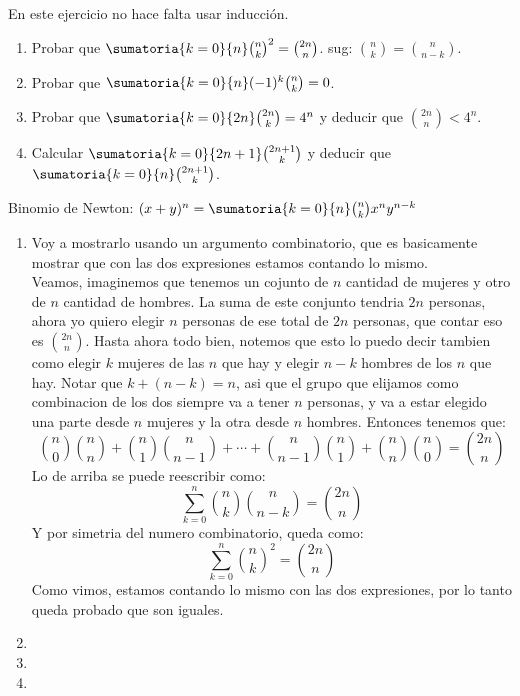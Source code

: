 \begin{enunciado}{\ejercicio}
  En este ejercicio no hace falta usar inducción.
  \begin{enumerate}[label=\roman*)]
    \item Probar que $\sumatoria{k = 0}{n} \binom{n}{k}^2 = \binom{2n}{n}$. \qquad sug: $\binom{n}{k} = \binom{n}{n-k}$.
    \item Probar que $\sumatoria{k = 0}{n} (-1)^k \binom{n}{k} = 0$.
    \item Probar que $\sumatoria{k = 0}{2n} \binom{2n}{k} = 4^n$ y deducir que $\binom{2n}{n} < 4^n$.
    \item Calcular $\sumatoria{k = 0}{2n+1} \binom{2n+1}{k}$ y deducir que $\sumatoria{k=0}{n} \binom{2n+1}{k}$.
  \end{enumerate}
\end{enunciado}

Binomio de Newton: $(x + y)^n = \sumatoria{k=0}{n} \binom{n}{k} x^n y^{n-k}$

\begin{enumerate}[label=\roman*)]
  \item
        Voy a mostrarlo usando un 
        argumento combinatorio, que es basicamente mostrar que con las dos expresiones estamos contando lo mismo. \\
        Veamos, imaginemos que tenemos un cojunto de $n$ cantidad de mujeres y otro de $n$ cantidad de hombres. La suma de este 
        conjunto tendria $2n$ personas, ahora yo quiero elegir $n$ personas de ese total de $2n$ personas, que contar eso es 
        $\binom{2n}{n}$. Hasta ahora todo bien, notemos que esto lo puedo decir tambien como elegir $k$ mujeres de las $n$ que hay 
        y elegir $n - k$ hombres de los $n$ que hay. Notar que $k + (n - k) = n$, asi que el grupo que elijamos como combinacion
        de los dos siempre va a tener $n$ personas, y va a estar elegido una parte desde $n$ mujeres y la otra desde $n$ hombres. 
        Entonces tenemos que:
        \[
        \binom{n}{0}\binom{n}{n} + \binom{n}{1}\binom{n}{n - 1} + \cdots + \binom{n}{n - 1}\binom{n}{1} + \binom{n}{n}\binom{n}{0} = \binom{2n}{n}
        \]
        Lo de arriba se puede reescribir como:
        \[
        \sum_{k = 0}^{n}\binom{n}{k}\binom{n}{n-k} = \binom{2n}{n}
        \]
        Y por simetria del numero combinatorio, queda como:
        \[
        \sum_{k = 0}^{n} \binom{n}{k}^2 = \binom{2n}{n}
        \]
        Como vimos, estamos contando lo mismo con las dos expresiones, por lo tanto queda probado que son iguales. 

  \item
        \hacer
  \item
        \hacer
  \item
        \hacer
\end{enumerate}


